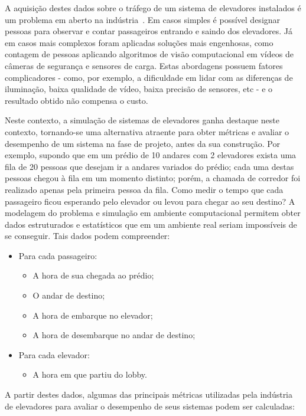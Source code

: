 A aquisição destes dados sobre o tráfego de um sistema de elevadores instalados é um problema em aberto na indústria~\cite{KOEHLEROTTIGER02}. Em casos simples é possível designar pessoas para observar e contar passageiros entrando e saindo dos elevadores. Já em casos mais complexos foram aplicadas soluções mais engenhosas, como contagem de pessoas aplicando algoritmos de visão computacional em vídeos de câmeras de segurança e sensores de carga. Estas abordagens possuem fatores complicadores - como, por exemplo, a dificuldade em lidar com as diferenças de iluminação, baixa qualidade de vídeo, baixa precisão de sensores, etc - e o resultado obtido não compensa o custo.

Neste contexto, a simulação de sistemas de elevadores ganha destaque neste contexto, tornando-se uma alternativa atraente para obter métricas e avaliar o desempenho de um sistema na fase de projeto, antes da sua construção. Por exemplo, supondo que em um prédio de 10 andares com 2 elevadores exista uma fila de 20 pessoas que desejam ir a andares variados do prédio; cada uma destas pessoas chegou à fila em um momento distinto; porém, a chamada de corredor foi realizado apenas pela primeira pessoa da fila. Como medir o tempo que cada passageiro ficou esperando pelo elevador ou levou para chegar ao seu destino? A modelagem do problema e simulação em ambiente computacional permitem obter dados estruturados e estatísticos que em um ambiente real seriam impossíveis de se conseguir. Tais dados podem compreender:

\begin{itemize}
  \item Para cada passageiro:
  \begin{itemize}
    \item A hora de sua chegada ao prédio;
    \item O andar de destino;
    \item A hora de embarque no elevador;
    \item A hora de desembarque no andar de destino;
  \end{itemize}
  \item Para cada elevador:
  \begin{itemize}
    \item A hora em que partiu do lobby.
  \end{itemize}
\end{itemize}

A partir destes dados, algumas das principais métricas utilizadas pela indústria de elevadores para avaliar o desempenho de seus sistemas podem ser calculadas:

